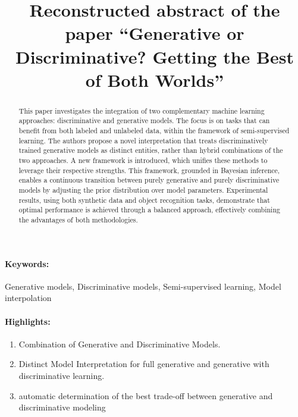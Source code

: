 \documentclass[12pt]{article}
\title{Reconstructed abstract of the paper ``Generative or Discriminative? Getting the Best of Both Worlds''}
\date{}
\begin{document}
\maketitle
\begin{abstract}
    This paper \cite{Bishop2007} investigates the integration of two complementary machine learning approaches: discriminative and generative models. The focus is on tasks that can benefit from both labeled and unlabeled data, within the framework of semi-supervised learning. The authors propose a novel interpretation that treats discriminatively trained generative models as distinct entities, rather than hybrid combinations of the two approaches. A new framework is introduced, which unifies these methods to leverage their respective strengths. This framework, grounded in Bayesian inference, enables a continuous transition between purely generative and purely discriminative models by adjusting the prior distribution over model parameters. Experimental results, using both synthetic data and object recognition tasks, demonstrate that optimal performance is achieved through a balanced approach, effectively combining the advantages of both methodologies.
\end{abstract}
\paragraph{Keywords:} Generative models, Discriminative models, Semi-supervised learning, Model interpolation

\paragraph{Highlights:}
\begin{enumerate}
\item Combination of Generative and Discriminative Models.
\item Distinct Model Interpretation for full generative and generative with discriminative learning.
\item automatic determination of the best trade-off between generative and discriminative modeling
\end{enumerate}



\end{document}
